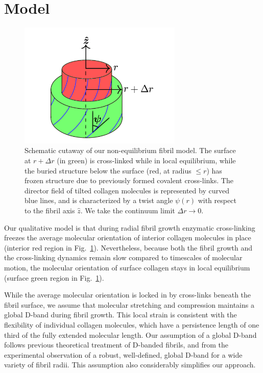 \documentclass[twoside,twocolumn,9pt]{article}
\begin{document}
\section{Model}
\begin{figure}[t!] %
\centering
  \includegraphics[height=6cm]{figure1.pdf}
  \caption{Schematic cutaway of our non-equilibrium fibril model. The surface at $r+ \Delta r$ (in green) is cross-linked while in local equilibrium, while the buried structure below the surface (red, at radius $ \leq r$) has frozen structure due to previously formed covalent cross-links. The director field of tilted collagen molecules is represented by curved blue lines, and is characterized by a twist angle $\psi(r)$ with respect to the fibril axis $\hat{z}$. We take the continuum limit $\Delta r \rightarrow 0$.}
  \label{fig:cartoon}
\end{figure}

Our qualitative model is that during radial fibril growth enzymatic cross-linking  freezes the average molecular orientation of interior collagen molecules in place (interior red region in Fig.~\ref{fig:cartoon}). Nevertheless, because both the fibril growth and the cross-linking dynamics remain slow compared to timescales of molecular motion, the molecular orientation of surface collagen stays in local equilibrium (surface green region in Fig.~\ref{fig:cartoon}). 

While  the average molecular orientation is locked in by cross-links beneath the fibril surface, we assume that molecular stretching and compression maintains a global D-band during fibril growth. This local strain is consistent with the flexibility of individual collagen molecules, which have a persistence length of one third of the fully extended molecular length.\cite{Rezaei:2018} Our assumption of a global D-band follows previous theoretical treatment of D-banded fibrils,\cite{Cameron:2020} and from the experimental observation of a robust, well-defined, global D-band for a wide variety of fibril radii.\cite{Baldwin:2020, Berenguer:2014, Hodge:1989, Quan:2015} This assumption also considerably simplifies our approach.
\end{document}
